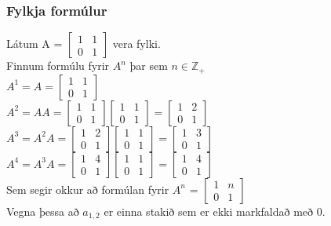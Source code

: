 \subsubsection{Fylkja formúlur}
Látum A = 
$\begin{bmatrix}
    1 & 1 \\
    0 & 1
\end{bmatrix}$ vera fylki.\\
Finnum formúlu fyrir $A^n$ þar sem $n \in \mathbb{Z}_+$\vspace*{1em} \\
$A^1 = A = 
\begin{bmatrix}
    1 & 1 \\
    0 & 1
\end{bmatrix}$\\
$A^2 = AA = 
\begin{bmatrix}
    1 & 1 \\
    0 & 1
\end{bmatrix}
\begin{bmatrix}
    1 & 1 \\
    0 & 1
\end{bmatrix} = 
\begin{bmatrix}
    1 & 2 \\
    0 & 1
\end{bmatrix}$\\
$A^3 = A^2A = 
\begin{bmatrix}
    1 & 2 \\
    0 & 1
\end{bmatrix}
\begin{bmatrix}
    1 & 1 \\
    0 & 1
\end{bmatrix} = 
\begin{bmatrix}
    1 & 3 \\
    0 & 1
\end{bmatrix}$\\
$A^4 = A^3A = 
\begin{bmatrix}
    1 & 4 \\
    0 & 1
\end{bmatrix}
\begin{bmatrix}
    1 & 1 \\
    0 & 1
\end{bmatrix} = 
\begin{bmatrix}
    1 & 4 \\
    0 & 1
\end{bmatrix}$\vspace*{1em}\\
Sem segir okkur að formúlan fyrir $A^n$ =
$\begin{bmatrix}
    1 & n \\
    0 & 1
\end{bmatrix}$ \vspace*{1em} \\
Vegna þessa að $a_{1,2}$ er einna stakið sem er ekki markfaldað með 0.

